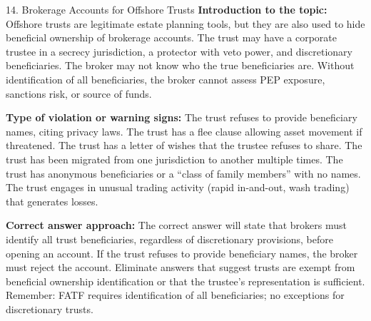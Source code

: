 \documentclass[11pt,a4paper]{beamer}
\begin{document}
\begin{frame}{14. Brokerage Accounts for Offshore Trusts}
\tiny
\noindent\textbf{Introduction to the topic:} Offshore trusts are legitimate estate planning tools, but they are also used to hide beneficial ownership of brokerage accounts. The trust may have a corporate trustee in a secrecy jurisdiction, a protector with veto power, and discretionary beneficiaries. The broker may not know who the true beneficiaries are. Without identification of all beneficiaries, the broker cannot assess PEP exposure, sanctions risk, or source of funds.

\vspace{0.1cm}
\noindent\textbf{Type of violation or warning signs:} The trust refuses to provide beneficiary names, citing privacy laws. The trust has a flee clause allowing asset movement if threatened. The trust has a letter of wishes that the trustee refuses to share. The trust has been migrated from one jurisdiction to another multiple times. The trust has anonymous beneficiaries or a “class of family members” with no names. The trust engages in unusual trading activity (rapid in-and-out, wash trading) that generates losses.

\vspace{0.1cm}
\noindent\textbf{Correct answer approach:} The correct answer will state that brokers must identify all trust beneficiaries, regardless of discretionary provisions, before opening an account. If the trust refuses to provide beneficiary names, the broker must reject the account. Eliminate answers that suggest trusts are exempt from beneficial ownership identification or that the trustee's representation is sufficient. Remember: FATF requires identification of all beneficiaries; no exceptions for discretionary trusts.
\end{frame}
\end{document}
